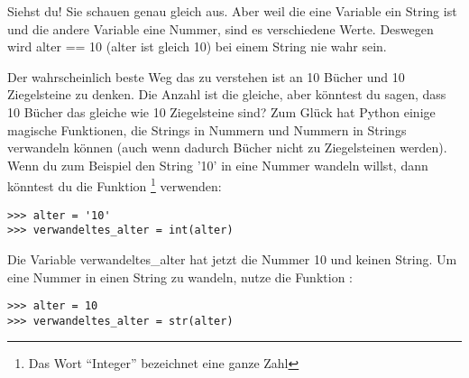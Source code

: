 Siehst du! Sie schauen genau gleich aus. Aber weil die eine Variable ein String ist und die andere Variable eine Nummer, sind es verschiedene Werte. Deswegen wird alter == 10 (alter ist gleich 10) bei einem String nie wahr sein.
\par
Der wahrscheinlich beste Weg das zu verstehen ist an 10 Bücher und 10 Ziegelsteine zu denken. Die Anzahl ist die gleiche, aber könntest du sagen, dass 10 Bücher das gleiche wie 10 Ziegelsteine sind? Zum Glück hat Python einige magische Funktionen, die Strings in Nummern und Nummern in Strings verwandeln können (auch wenn dadurch Bücher nicht zu Ziegelsteinen werden). Wenn du zum Beispiel den String '10' in eine Nummer wandeln willst, dann könntest du die Funktion \footnote{Das Wort ``Integer'' bezeichnet eine ganze Zahl} verwenden:

\begin{Verbatim}[frame=single]
>>> alter = '10'
>>> verwandeltes_alter = int(alter)
\end{Verbatim}

\noindent
Die Variable verwandeltes\_alter hat jetzt die Nummer 10 und keinen String. Um eine Nummer in einen String zu wandeln, nutze die Funktion :

\begin{Verbatim}[frame=single]
>>> alter = 10
>>> verwandeltes_alter = str(alter)
\end{Verbatim}

